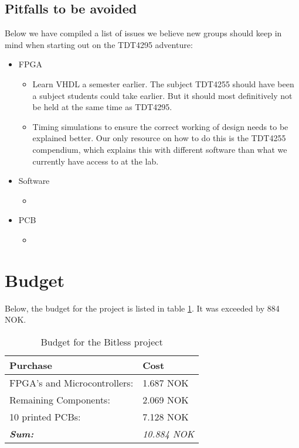 \subsection{Pitfalls to be avoided}\label{conclusion:pitfalls}
Below we have compiled a list of issues we believe new groups should keep in mind when starting out on the TDT4295 adventure:
\begin{itemize}
	\item FPGA
	\begin{itemize}
		\item Learn VHDL a semester earlier. The subject TDT4255 should have been a subject students could take earlier.
But it should most definitively not be held at the same time as TDT4295.
		\item Timing simulations to ensure the correct working of design needs to be explained better.
Our only resource on how to do this is the TDT4255 compendium\cite{}, which explains this with different software than what we currently have access to at the lab.
	\end{itemize}
	\item Software
	\begin{itemize}
		\item
	\end{itemize}
	\item PCB
	\begin{itemize}
		\item
	\end{itemize}
\end{itemize}

\section{Budget}
Below, the budget for the project is listed in table \ref{tab:budget}.
It was exceeded by 884 NOK.

\begin{table}[H]
	\centering
	\begin{tabular}{|l|l|}
		\hline
		\textbf{Purchase} & \textbf{Cost} \\
		\hline
		\hline
		FPGA's and Microcontrollers: & 1.687 NOK\\
		\hline
		Remaining Components: & 2.069 NOK\\
		\hline
		10 printed PCBs: & 7.128 NOK \\
		\hline
		\hline
		\textbf{\textit{Sum:}} & \textit{10.884 NOK}\\
		\hline
	\end{tabular}
	\caption{Budget for the Bitless project}
	\label{tab:budget}
\end{table}

